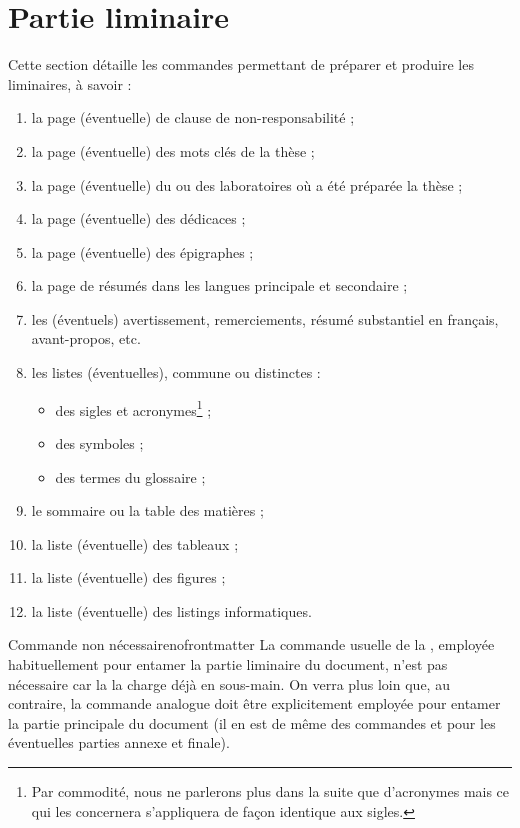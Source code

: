 \chapter{Partie liminaire}\label{cha-liminaires}
%
%
%

Cette section détaille les commandes permettant de préparer et produire les
\glspl{liminaire}, à savoir :
\begin{enumerate}
\item la page (éventuelle) de clause de non-responsabilité ;
\item la page (éventuelle) des mots clés de la thèse ;
\item la page (éventuelle) du ou des laboratoires où a été préparée la thèse ;
\item la page (éventuelle) des dédicaces ;
\item la page (éventuelle) des épigraphes ;
\item la page de résumés dans les langues principale et secondaire ;
\item les (éventuels) avertissement, remerciements, résumé substantiel en
  français, avant-propos, etc.
\item les listes (éventuelles), commune ou distinctes :
  \begin{itemize}
  \item des sigles et acronymes\footnote{Par commodité, nous ne parlerons plus
      dans la suite que d'acronymes mais ce qui les concernera s'appliquera de
      façon identique aux sigles.} ;
  \item des symboles ;
  \item des termes du glossaire ;
  \end{itemize}
\item le sommaire ou la table des matières ;
\item la liste (éventuelle) des tableaux ;
\item la liste (éventuelle) des figures ;
\item la liste (éventuelle) des listings informatiques.
\end{enumerate}

\begin{dbremark}{Commande \protect{} non nécessaire}{nofrontmatter}
  La commande  usuelle de la , employée
  habituellement pour entamer la partie liminaire du document, n'est pas
  nécessaire car la \yatCl{} la charge déjà en sous-main. On verra plus loin
  que, au contraire, la commande analogue  doit être
  explicitement employée pour entamer la partie principale du document (il en
  est de même des commandes  et  pour les
  éventuelles parties annexe et finale).
\end{dbremark}

